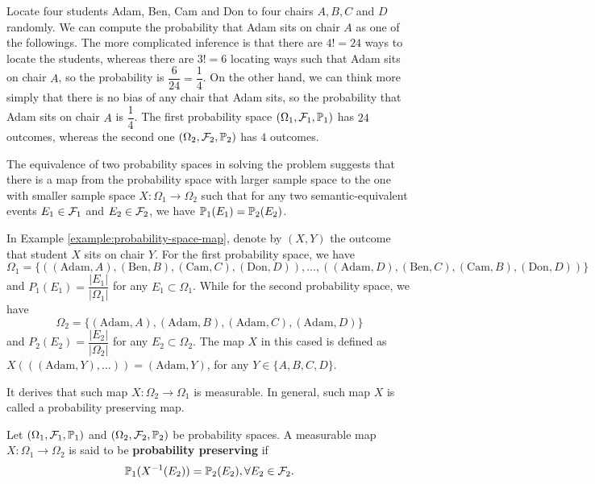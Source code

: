 \begin{example}
 \label{example:probability-space-map}
 Locate four students Adam, Ben, Cam and Don to four chairs $A,B,C$ and $D$ randomly. We can compute the probability that Adam sits on chair $A$ as one of the followings. The more complicated inference is that there are $4! = 24$ ways to locate the students, whereas there are $3! = 6$ locating ways such that Adam sits on chair $A$, so the probability is $\dfrac{6}{24}=\dfrac{1}{4}$. On the other hand, we can think more simply that there is no bias of any chair that Adam sits, so the probability that Adam sits on chair $A$ is $\dfrac{1}{4}$. The first probability space $(\Omega_1, \mathcal{F}_1, \mathbb{P}_1)$ has $24$ outcomes, whereas the second one $(\Omega_2, \mathcal{F}_2, \mathbb{P}_2)$ has $4$ outcomes.
\end{example}

The equivalence of two probability spaces in solving the problem suggests that there is a map from the probability space with larger sample space to the one with smaller sample space $X : \Omega_1 \to \Omega_2$ such that for any two semantic-equivalent events $E_1\in\mathcal{F}_1$ and $E_2\in\mathcal{F}_2$, we have $\mathbb{P}_1(E_1) = \mathbb{P}_2(E_2)$.

\begin{example}
 In Example \ref{example:probability-space-map}, denote by $(X,Y)$ the outcome that student $X$ sits on chair $Y$. For the first probability space, we have
 $$\Omega_1=\{
  ((\text{Adam}, A), (\text{Ben}, B), (\text{Cam}, C), (\text{Don}, D)),
  \ldots,
  ((\text{Adam}, D), (\text{Ben}, C), (\text{Cam}, B), (\text{Don}, D))\}$$
 and $P_1(E_1) = \dfrac{|E_1|}{|\Omega_1|}$ for any $E_1\subset \Omega_1$. While for the second probability space, we have
 $$\Omega_2=\{(\text{Adam}, A), (\text{Adam}, B), (\text{Adam}, C), (\text{Adam}, D)\}$$
 and $P_2(E_2) = \dfrac{|E_2|}{|\Omega_2|}$ for any $E_2\subset \Omega_2$.
 The map $X$ in this cased is defined as $X(((\text{Adam}, Y), \ldots)) = (\text{Adam}, Y)$, for any $Y\in\{A,B,C,D\}$.
\end{example}

It derives that such map $X : \Omega_2 \to \Omega_1$ is measurable. In general, such map $X$ is called a probability preserving map.

\begin{definition}
 Let $(\Omega_1, \mathcal{F}_1, \mathbb{P}_1)$ and $(\Omega_2, \mathcal{F}_2, \mathbb{P}_2)$ be probability spaces. A measurable map $X : \Omega_1 \to \Omega_2$ is said to be \textbf{probability preserving} if
 $$\mathbb{P}_1(X^{-1}(E_2)) = \mathbb{P}_2(E_2), \forall E_2 \in \mathcal{F}_2.$$
\end{definition}


